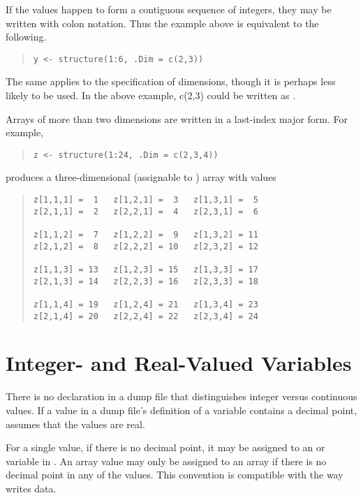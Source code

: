 If the values happen to form a contiguous sequence of integers,
they may be written with colon notation.  Thus the example above is
equivalent to the following.
%
\begin{quote}
\begin{verbatim}
y <- structure(1:6, .Dim = c(2,3))
\end{verbatim}
\end{quote}
%
The same applies to the specification of dimensions, though it is
perhaps less likely to be used. In the above example,
c(2,3) could be written as .

Arrays of more than two dimensions are written in a last-index major form.
For example, 
%
\begin{quote}
\begin{verbatim}
z <- structure(1:24, .Dim = c(2,3,4))
\end{verbatim}
\end{quote}
%
produces a three-dimensional  (assignable to )
array  with values
%
\begin{quote}
\begin{verbatim}
z[1,1,1] =  1   z[1,2,1] =  3   z[1,3,1] =  5
z[2,1,1] =  2   z[2,2,1] =  4   z[2,3,1] =  6

z[1,1,2] =  7   z[1,2,2] =  9   z[1,3,2] = 11
z[2,1,2] =  8   z[2,2,2] = 10   z[2,3,2] = 12

z[1,1,3] = 13   z[1,2,3] = 15   z[1,3,3] = 17
z[2,1,3] = 14   z[2,2,3] = 16   z[2,3,3] = 18

z[1,1,4] = 19   z[1,2,4] = 21   z[1,3,4] = 23
z[2,1,4] = 20   z[2,2,4] = 22   z[2,3,4] = 24
\end{verbatim}
\end{quote}



\section{Integer- and Real-Valued Variables}

There is no declaration in a dump file that distinguishes integer
versus continuous values.  If a value in a dump file's definition of a
variable contains a decimal point, \Stan assumes that the values are
real.  

For a single value, if there is no decimal point, it may be assigned
to an  or  variable in \Stan.  An array value may
only be assigned to an  array if there is no decimal point
in any of the values.  This convention is compatible with the way \R
writes data.

